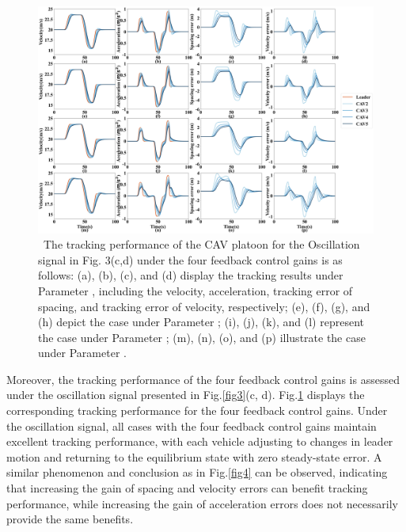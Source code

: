 \documentclass[journal]{IEEEtran}
\begin{document}
\begin{figure}

  \centering
  \includegraphics[width=16cm]{figs/fig5.png}
  \caption{~The tracking performance of the CAV platoon for the Oscillation signal in Fig. 3(c,d) under the four feedback control gains is as follows: (a), (b), (c), and (d) display the tracking results under Parameter \uppercase\expandafter{}, including the velocity, acceleration, tracking error of spacing, and tracking error of velocity, respectively; (e), (f), (g), and (h) depict the case under Parameter \uppercase\expandafter{}; (i), (j), (k), and (l) represent the case under Parameter \uppercase\expandafter{}; (m), (n), (o), and (p) illustrate the case under Parameter \uppercase\expandafter{}.}
  \label{fig5}
\end{figure}

Moreover, the tracking performance of the four feedback control gains is assessed under the oscillation signal presented in Fig.\ref{fig3}(c, d). Fig.\ref{fig5} displays the corresponding tracking performance for the four feedback control gains. Under the oscillation signal, all cases with the four feedback control gains maintain excellent tracking performance, with each vehicle adjusting to changes in leader motion and returning to the equilibrium state with zero steady-state error. A similar phenomenon and conclusion as in Fig.\ref{fig4} can be observed, indicating that increasing the gain of spacing and velocity errors can benefit tracking performance, while increasing the gain of acceleration errors does not necessarily provide the same benefits.
\end{document}
